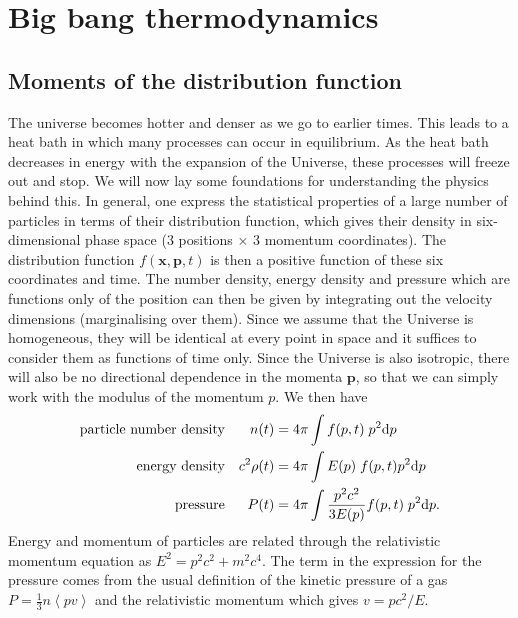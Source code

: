 \documentclass[a4paper]{article}
\begin{document}
\section{Big bang thermodynamics} 
\subsection{Moments of the distribution function}
The universe becomes hotter and denser as we go to earlier times. This leads to a heat bath in which many processes can occur in equilibrium. As the heat bath decreases in energy with the expansion of the Universe, these processes will freeze out and stop. We will now lay some foundations for understanding the physics behind this. In general, one express the statistical properties of a large number of particles in terms of their distribution function, which gives their density in six-dimensional phase space (3 positions $\times$ 3 momentum coordinates). The distribution function $f(\mathbf{x},\mathbf{p},t)$ is then a positive function of these six coordinates and time. The number density, energy density and pressure which are functions only of the position can then be given by integrating out the velocity dimensions (marginalising over them). Since we assume that the Universe is homogeneous, they will be identical at every point in space and it suffices to consider them as functions of time only. Since the Universe is also isotropic, there will also be no directional dependence in the momenta $\mathbf{p}$, so that we can simply work with the modulus of the momentum $p$. We then have
\begin{align}
\text{particle number density} && n(t) & =  4\pi \int f(p,t) \;p^2 {\rm d}p \\
\text{energy density} && c^2\rho(t) & = 4\pi\int E(p) \;f(p,t) p^2 {\rm d}p \\
\text{pressure} && P(t) & =  4\pi \int \frac{p^2 c^2}{3E(p)} f(p,t) \;p^2 {\rm d}p.
\end{align}
Energy and momentum of particles are related through the relativistic momentum equation as $E^2 = p^2c^2+m^2c^4$. The term in the expression for the pressure comes from the usual definition of the kinetic pressure of a gas $P=\frac{1}{3}n\left<p v\right>$ and the relativistic momentum which gives $v = p c^2/E$.
\end{document}
